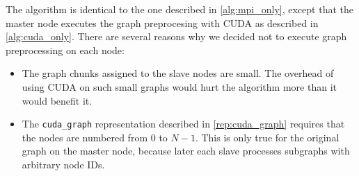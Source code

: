 \label{alg:cuda_mpi}
The algorithm is identical to the one described in \ref{alg:mpi_only}, except that the master node executes the graph preprocesing with CUDA as described in \ref{alg:cuda_only}. There are several reasons why we decided not to execute graph preprocessing on each node:
\begin{itemize}
  \item The graph chunks assigned to the slave nodes are small. The overhead of using CUDA on such small graphs would hurt the algorithm more than it would benefit it.
  \item The \verb|cuda_graph| representation described in \ref{rep:cuda_graph} requires that the nodes are numbered from $0$ to $N-1$. This is only true for the original graph on the master node, because later each slave processes subgraphs with arbitrary node IDs.
\end{itemize}